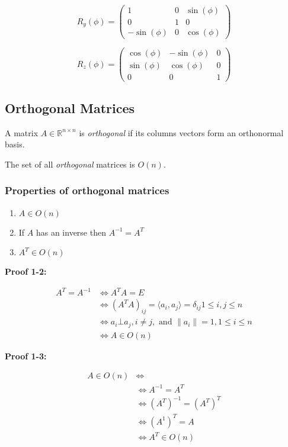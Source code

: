 \[
R_y (\phi) =
\begin{pmatrix}
    1 & 0 & \sin(\phi) \\
    0 & 1 & 0 \\
    -\sin(\phi) & 0 & \cos(\phi)
\end{pmatrix}
\]

\[
R_z (\phi) =
\begin{pmatrix}
    \cos(\phi) & -\sin(\phi) & 0 \\
    \sin(\phi) & \cos(\phi) & 0 \\
    0 & 0 & 1
\end{pmatrix}
\]


\subsection{Orthogonal Matrices}

A matrix \(A \in \mathbb{R}^{n \times n}\) is \emph{orthogonal} if its columns vectors form an orthonormal 
basis.
\vspace{\baselineskip}

The set of all \emph{orthogonal} matrices is \(O(n)\).

\subsubsection{Properties of orthogonal matrices}

\begin{enumerate}
    \item \(A \in O(n)\)
    \item If \(A\) has an inverse then \(A^{-1} = A^T\)
    \item \(A^T \in O(n)\)
\end{enumerate}

\textbf{Proof 1-2:}

\begin{align*}
    A^T = A^{-1} &\iff A^T A = E\\
                 &\iff (A^T A)_{ij} = \langle a_i, a_j\rangle = \delta_{ij} 1 \le i,j \le n\\
                 &\iff a_i \bot a_j, i \ne j, \text{ and } \|a_i\| = 1, 1 \le i \le n\\
                 &\iff A \in O(n)
\end{align*}

\textbf{Proof 1-3:}

\begin{align*}
    A \in O(n) &\iff \\
               &\iff A^{-1} = A^T\\
               &\iff (A^T)^{-1} = (A^T)^T \\
               &\iff (A^{1})^{T} = A\\
               &\iff A^T \in O(n)
\end{align*}

